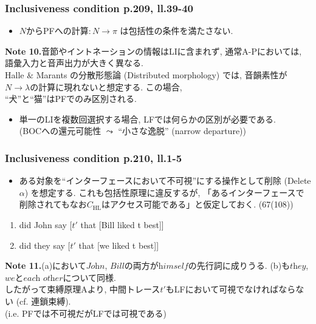 \documentclass[dvipdfmx, xcolor={dvipsnames},12pt]{beamer}
\begin{document}
\begin{frame}
\frametitle{Inclusiveness condition p.209, ll.39-40}

\begin{itemize}
 \item $N$からPFへの計算$\colon N \to \pi$ は包括性の条件を満たさない. 
\end{itemize}
\begin{marker}
\textbf{Note 10.}音節やイントネーションの情報はLIに含まれず, 通常A-Pにおいては, 語彙入力と音声出力が大きく異なる.\\
Halle $\&$ Marants の分散形態論 (Distributed morphology) では, 音韻素性が$N \to \lambda$の計算に現れないと想定する. この場合, \\``犬''と``猫''はPFでのみ区別される.
\end{marker}
\begin{itemize}
 \item 単一のLIを複数回選択する場合, LFでは何らかの区別が必要である. \\
(BOCへの還元可能性 $\leadsto$ ``小さな逸脱'' (narrow departure))
\end{itemize}
\end{frame}

\begin{frame}
\frametitle{Inclusiveness condition p.210, ll.1-5}

\begin{itemize}
 \item ある対象を``インターフェースにおいて不可視''にする操作として削除 (Delete $\alpha$) を想定する. これも包括性原理に違反するが, 「あるインターフェースで削除されてもなお$C_{\mathrm{HL}}$はアクセス可能である」と仮定しておく. (67(108))
\end{itemize}

\begin{enumerate}
 \item[(a)] [which picture of himself] did John say [$t'$ that [Bill liked t best]]
 \item[(b)] [which pictures of each other] did they say [$t'$ that [we liked t best]]
\end{enumerate}

\begin{marker}
\textbf{Note 11.}(a)において$\textit{John}$, $\textit{Bill}$の両方が$\textit{himself}$の先行詞に成りうる. (b)も$\textit{they}$, $\textit{we}$と$\textit{each other}$について同様.\\
したがって束縛原理Aより, 中間トレース$t'$もLFにおいて可視でなければならない (cf. 連鎖束縛).\\(i.e. PFでは不可視だがLFでは可視である)
\end{marker}

\end{frame}
\end{document}
